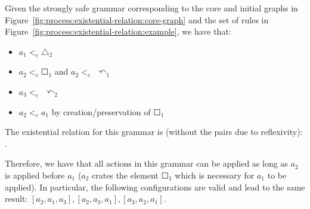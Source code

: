 \begin{example}\label{ex:process:existential-relation} Given the strongly safe grammar corresponding to the core and initial graphs in Figure~\ref{fig:process:existential-relation:core-graph} and the set of rules in Figure~\ref{fig:process:existential-relation:example}, we have that:

\begin{itemize}
  \item $a_1 <_e \triangle_2$
  \item $a_2 <_e \Square_1$ and $a_2 <_e$ $\curvearrowleft_1$
  \item $a_3 <_e$ $\curvearrowleft_2$
  \item $a_2 <_e a_1$ by creation/preservation of $\Square_1$
\end{itemize}

  The existential relation for this grammar is (without the pairs due to reflexivity): .

  Therefore, we have that all actions in this grammar can be applied as long as $a_2$ is applied before $a_1$ ($a_2$ crates the element $\Square_1$ which is necessary for $a_1$ to be applied). In particular, the following configurations are valid and lead to the same result: $[a_2,a_1,a_3],[a_2,a_3,a_1],[a_3,a_2,a_1]$.


\end{example}
